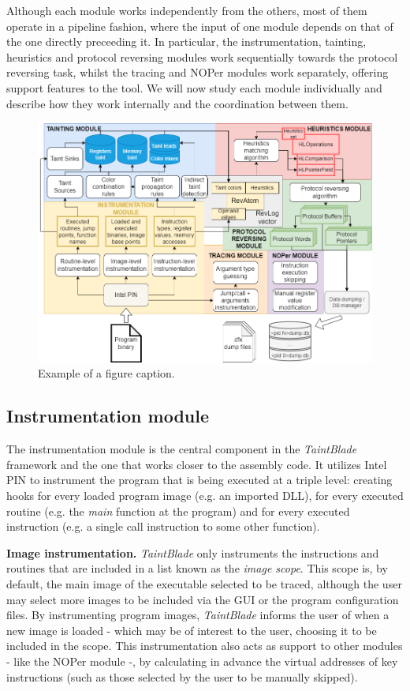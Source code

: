\documentclass[conference]{IEEEtran}
\begin{document}
Although each module works independently from the others, most of them operate
in a pipeline fashion, where the input of one module depends on that of the one
directly preceeding it. In particular, the instrumentation, tainting,
heuristics and protocol reversing modules work sequentially towards the
protocol reversing task, whilst the tracing and NOPer modules work separately,
offering support features to the tool. We will now study each module
individually and describe how they work internally and the coordination between
them.

\begin{figure}
    \centerline{\includegraphics[width=\textwidth]{images/archdetailedsteps.drawio.png}}
    \caption{Example of a figure caption.}
    \label{figure:fig_3_archdetailedsteps}
\end{figure}

\subsection{Instrumentation module}
The instrumentation module is the central component in the \textit{TaintBlade}
framework and the one that works closer to the assembly code. It utilizes Intel
PIN to instrument the program that is being executed at a triple level:
creating hooks for every loaded program image (e.g. an imported DLL), for every
executed routine (e.g. the \textit{main} function at the program) and for every
executed instruction (e.g. a single call instruction to some other function).

\textbf{Image instrumentation.}
\textit{TaintBlade} only instruments the instructions and routines that are included
in a list known as the \textit{image scope}. This scope is, by default, the main image of the executable
selected to be traced, although the user may select more images to be included via the GUI or
the program configuration files. By instrumenting program images, \textit{TaintBlade} informs the
user of when a new image is loaded - which may be of interest to the user, choosing it to be included
in the scope. This instrumentation also acts as support to other modules - like the NOPer module -, by calculating in
advance the virtual addresses of key instructions (such as those selected by the user to be manually skipped).
\end{document}
